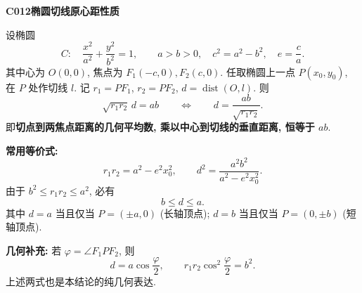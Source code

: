 \begin{statementbox}
\textbf{C012\quad 椭圆切线原心距性质}

设椭圆
\[
C:\quad \frac{x^2}{a^2}+\frac{y^2}{b^2}=1,
\qquad a>b>0,\quad c^2=a^2-b^2,\quad e=\frac ca.
\]
其中心为 $O(0,0)$, 焦点为 $F_1(-c,0),F_2(c,0)$.
任取椭圆上一点 $P(x_0,y_0)$, 在 $P$ 处作切线 $l$.
记 $r_1=PF_1$, $r_2=PF_2$, $d=\operatorname{dist}(O,l)$.
则
\[
\boxed{\sqrt{r_1r_2}\,d=ab}
\qquad\Longleftrightarrow\qquad
\boxed{d=\frac{ab}{\sqrt{r_1r_2}}}.
\]
即\textbf{切点到两焦点距离的几何平均数, 乘以中心到切线的垂直距离, 恒等于 $ab$}.

\textbf{常用等价式:}
\[
r_1r_2=a^2-e^2x_0^2,
\qquad
\boxed{d^2=\frac{a^2b^2}{a^2-e^2x_0^2}}.
\]
由于 $b^2\le r_1r_2\le a^2$, 必有
\[
\boxed{b\le d\le a}.
\]
其中 $d=a$ 当且仅当 $P=(\pm a,0)$ (长轴顶点);
$d=b$ 当且仅当 $P=(0,\pm b)$ (短轴顶点).

\textbf{几何补充:} 若 $\varphi=\angle F_1PF_2$, 则
\[
\boxed{d=a\cos\frac\varphi2},\qquad
\boxed{r_1r_2\cos^2\frac\varphi2=b^2}.
\]
上述两式也是本结论的纯几何表达.
\end{statementbox}
